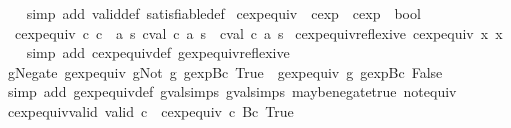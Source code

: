 \begin{isabellebody}
%
\isadelimproof
\ \ %
\endisadelimproof
%
\isatagproof
{}\isamarkupfalse%
\ {\isacharparenleft}simp\ add{\isacharcolon}\ valid{\isacharunderscore}def\ satisfiable{\isacharunderscore}def{\isacharparenright}%
\endisatagproof
{\isafoldproof}%
%
\isadelimproof
\isanewline
%
\endisadelimproof
\isanewline
{}\isamarkupfalse%
\ cexp{\isacharunderscore}equiv\ {\isacharcolon}{\isacharcolon}\ {\isachardoublequoteopen}cexp\ {\isasymRightarrow}\ cexp\ {\isasymRightarrow}\ bool{\isachardoublequoteclose}\ \isanewline
\ \ {\isachardoublequoteopen}cexp{\isacharunderscore}equiv\ c\ c{\isacharprime}\ {\isasymequiv}\ {\isacharparenleft}{\isasymforall}a\ s{\isachardot}\ cval\ c\ a\ s\ {\isacharequal}\ cval\ c{\isacharprime}\ a\ s{\isacharparenright}{\isachardoublequoteclose}\isanewline
\isanewline
{}\isamarkupfalse%
\ cexp{\isacharunderscore}equiv{\isacharunderscore}reflexive{\isacharcolon}\ {\isachardoublequoteopen}cexp{\isacharunderscore}equiv\ x\ x{\isachardoublequoteclose}\isanewline
%
\isadelimproof
\ \ %
\endisadelimproof
%
\isatagproof
{}\isamarkupfalse%
\ {\isacharparenleft}simp\ add{\isacharcolon}\ cexp{\isacharunderscore}equiv{\isacharunderscore}def\ gexp{\isacharunderscore}equiv{\isacharunderscore}reflexive{\isacharparenright}%
\endisatagproof
{\isafoldproof}%
%
\isadelimproof
\isanewline
%
\endisadelimproof
\isanewline
{}\isamarkupfalse%
\ gNegate{\isacharcolon}\ {\isachardoublequoteopen}gexp{\isacharunderscore}equiv\ {\isacharparenleft}gNot\ g{\isacharparenright}\ {\isacharparenleft}gexp{\isachardot}Bc\ True{\isacharparenright}\ {\isacharequal}\ gexp{\isacharunderscore}equiv\ g\ {\isacharparenleft}gexp{\isachardot}Bc\ False{\isacharparenright}{\isachardoublequoteclose}\isanewline
%
\isadelimproof
\ \ %
\endisadelimproof
%
\isatagproof
{}\isamarkupfalse%
\ {\isacharparenleft}simp\ add{\isacharcolon}\ gexp{\isacharunderscore}equiv{\isacharunderscore}def\ gval{\isachardot}simps{\isacharparenleft}{}{\isacharparenright}\ gval{\isachardot}simps{\isacharparenleft}{}{\isacharparenright}\ maybe{\isacharunderscore}negate{\isacharunderscore}true\ not{\isacharunderscore}equiv{\isacharparenright}%
\endisatagproof
{\isafoldproof}%
%
\isadelimproof
\isanewline
%
\endisadelimproof
\isanewline
{}\isamarkupfalse%
\ cexp{\isacharunderscore}equiv{\isacharunderscore}valid{\isacharcolon}\ {\isachardoublequoteopen}valid\ c\ {\isasymlongrightarrow}\ cexp{\isacharunderscore}equiv\ c\ {\isacharparenleft}Bc\ True{\isacharparenright}{\isachardoublequoteclose}\isanewline

\end{isabellebody}
